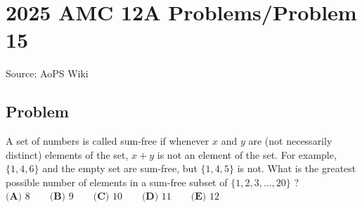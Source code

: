 \documentclass[12pt]{article}
\begin{document}
\section*{{2025 AMC 12A Problems/Problem 15}}
Source: AoPS Wiki

\subsection*{Problem}
A set of numbers is called sum-free if whenever $x$ and $y$ are (not necessarily distinct) elements of the set, $x+y$ is not an element of the set. For example, $\{1,4,6\}$ and the empty set are sum-free, but $\{1,4,5\}$ is not. What is the greatest possible number of elements in a sum-free subset of $\{1,2,3,...,20\}$ ? $\textbf{(A) } 8 \qquad\textbf{(B) } 9 \qquad\textbf{(C) } 10 \qquad\textbf{(D) } 11 \qquad\textbf{(E) } 12$
\end{document}
